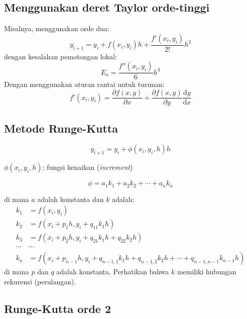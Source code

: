 \subsection*{Menggunakan deret Taylor orde-tinggi}

Misalnya, menggunakan orde dua:
\begin{equation*}
y_{i+1} = y_{i} + f(x_i, y_i)h + \frac{f'(x_i, y_i)}{2!}h^2
\end{equation*}
dengan kesalahan pemotongan lokal:
\begin{equation*}
E_{a} = \frac{f''(x_i, y_i)}{6} h^3
\end{equation*}
Dengan menggunakan aturan rantai untuk turunan:
\begin{equation*}
f'(x_i, y_i) = \frac{\partial f(x,y)}{\partial x} +
\frac{\partial f(x,y)}{\partial y}\frac{\mathrm{d}y}{\mathrm{d}x}
\end{equation*}


\subsection*{Metode Runge-Kutta}

\begin{equation*}
y_{i+1} = y_{i} + \phi(x_i, y_i, h) h
\end{equation*}

$\phi(x_i, y_i, h)$: fungsi kenaikan (\textit{increment})

\begin{equation*}
\phi = a_1 k_1 + a_2 k_2 + \cdots + a_n k_n
\end{equation*}

di mana $a$ adalah konstanta dan $k$ adalah:
\begin{align*}
k_1 & = f(x_i, y_i) \\
k_2 & = f(x_i + p_1 h, y_i + q_{11} k_1 h ) \\
k_3 & = f(x_i + p_2 h, y_i + q_{21} k_1 h + q_{22} k_2 h) \\
\cdots & \cdots \\
k_n & = f(x_i + p_{n-1}h, y_i + q_{n-1,1} k_1 h + q_{n-1,2} k_2 h + \cdots + q_{n-1,n-1} k_{n-1} h)
\end{align*}
di mana $p$ dan $q$ adalah konstanta.
Perhatikan bahwa $k$ memiliki hubungan rekurensi (perulangan).


\subsection{Runge-Kutta orde 2}

